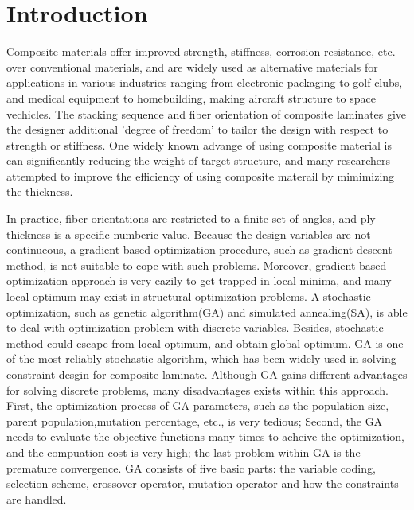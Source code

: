\section{Introduction}
Composite materials offer improved strength, stiffness, corrosion resistance,
etc. over conventional materials, and are widely used as alternative materials
for applications in various industries ranging from electronic packaging to golf
clubs, and medical equipment to homebuilding, making aircraft structure to space
vechicles. The stacking sequence and fiber orientation of composite laminates
give the designer additional 'degree of freedom' to tailor the design with
respect to strength or stiffness.  One widely known advange of using composite
material is can significantly reducing the weight of target structure, and many
researchers attempted to improve the efficiency of using composite materail by
mimimizing the thickness\cite { schmit1973optimum, schmit1977optimum,
	fukunaga1991strength, soares1995discrete, le1995improved,
	jayatheertha1996application, wang1996optimum, adali1997minimum,
	correia1997higher, scares1997optimization, abu1998optimum, lombardi1998anti,
	le1998design, sivakumar1998optimum, barakat1999use, richard2000reliability,
moita2000sensitivity, soremekun2001composite, walker2003technique,
di2003multiconstrained, kere2003using}.

In practice, fiber orientations are restricted to a finite set of angles, and
ply thickness is a specific numberic value.  Because the design variables are
not continueous, a gradient based optimization procedure, such as gradient
descent method, is not suitable to cope with such problems.  Moreover, gradient
based optimization approach is very eazily to get trapped in local minima, and
many local optimum may exist in structural optimization problems. A stochastic
optimization, such as genetic algorithm(GA) and simulated annealing(SA), is able
to deal with optimization problem with discrete variables. Besides, stochastic
method could escape from local optimum, and obtain global optimum.  GA is one of
the most reliably stochastic algorithm, which has been widely used in solving
constraint desgin for composite
laminate\cite{callahan1992optimum,soremekun2001composite,park2001stacking,walker2003technique,deka2005multiobjective,pelletier2006multi,jadhav2007parametric,kim2007development,park2008improved}.
Although GA gains different advantages for solving discrete problems, many
disadvantages exists within this approach. First, the optimization process of GA
parameters, such as the population size, parent population,mutation percentage,
etc., is very tedious; Second, the GA needs to evaluate the objective functions
many times to acheive the optimization, and the compuation cost is very high;
the last problem within GA is the premature convergence. GA consists of five
basic parts: the variable coding, selection scheme, crossover operator, mutation
operator and how the constraints are handled.

